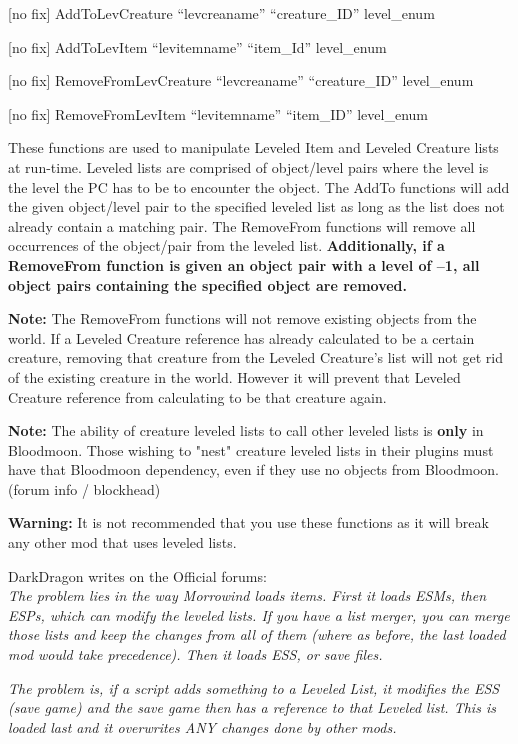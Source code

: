 {[}no fix{]} AddToLevCreature ``levcreaname'' ``creature\_ID''
level\_enum

{[}no fix{]} AddToLevItem ``levitemname'' ``item\_Id'' level\_enum

{[}no fix{]} RemoveFromLevCreature ``levcreaname'' ``creature\_ID''
level\_enum

{[}no fix{]} RemoveFromLevItem ``levitemname'' ``item\_ID'' level\_enum

These functions are used to manipulate Leveled Item and Leveled Creature
lists at run-time. Leveled lists are comprised of object/level pairs
where the level is the level the PC has to be to encounter the object.
The AddTo functions will add the given object/level pair to the
specified leveled list as long as the list does not already contain a
matching pair. The RemoveFrom functions will remove all occurrences of
the object/pair from the leveled list. \textbf{Additionally, if a
RemoveFrom function is given an object pair with a level of --1, all
object pairs containing the specified object are removed.}

\textbf{Note:} The RemoveFrom functions will not remove existing objects
from the world. If a Leveled Creature reference has already calculated
to be a certain creature, removing that creature from the Leveled
Creature's list will not get rid of the existing creature in the world.
However it will prevent that Leveled Creature reference from calculating
to be that creature again.

\textbf{Note:} The ability of creature leveled lists to call other
leveled lists is \textbf{only} in Bloodmoon. Those wishing to "nest"
creature leveled lists in their plugins must have that Bloodmoon
dependency, even if they use no objects from Bloodmoon. (forum info /
blockhead)

\textbf{Warning:} It is not recommended that you use these functions as
it will break any other mod that uses leveled lists.

DarkDragon writes on the Official forums:\\
\emph{The problem lies in the way Morrowind loads items. First it loads
ESMs, then ESPs, which can modify the leveled lists. If you have a list
merger, you can merge those lists and keep the changes from all of them
(where as before, the last loaded mod would take precedence). Then it
loads ESS, or save files.}

\emph{\hfill\break
The problem is, if a script adds something to a Leveled List, it
modifies the ESS (save game) and the save game then has a reference to
that Leveled list. This is loaded last and it overwrites ANY changes
done by other mods.}

